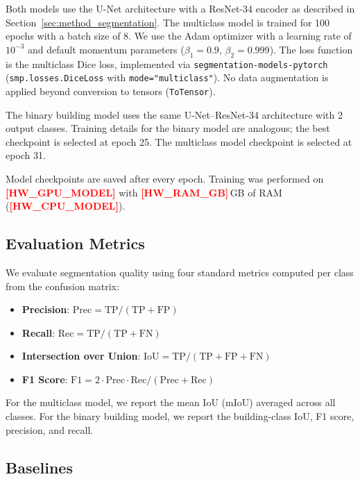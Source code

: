 \documentclass[11pt]{article}
\newcommand{\placeholder}[1]{\textcolor{red}{\textbf{[#1]}}}
\begin{document}
Both models use the U-Net architecture with a ResNet-34 encoder as described in Section~\ref{sec:method_segmentation}.
The multiclass model is trained for 100 epochs with a batch size of 8.
We use the Adam optimizer with a learning rate of $10^{-3}$ and default momentum parameters ($\beta_1 = 0.9$, $\beta_2 = 0.999$).
The loss function is the multiclass Dice loss, implemented via \texttt{segmentation-models-pytorch} (\texttt{smp.losses.DiceLoss} with \texttt{mode="multiclass"}).
No data augmentation is applied beyond conversion to tensors (\texttt{ToTensor}).

The binary building model uses the same U-Net--ResNet-34 architecture with 2 output classes.
Training details for the binary model are analogous; the best checkpoint is selected at epoch 25.
The multiclass model checkpoint is selected at epoch 31.

Model checkpoints are saved after every epoch.
Training was performed on \placeholder{HW\_GPU\_MODEL} with \placeholder{HW\_RAM\_GB}\,GB of RAM (\placeholder{HW\_CPU\_MODEL}).

\subsection{Evaluation Metrics}
\label{sec:experiments_metrics}

We evaluate segmentation quality using four standard metrics computed per class from the confusion matrix:
\begin{itemize}
    \item \textbf{Precision}: $\text{Prec} = \text{TP} / (\text{TP} + \text{FP})$
    \item \textbf{Recall}: $\text{Rec} = \text{TP} / (\text{TP} + \text{FN})$
    \item \textbf{Intersection over Union}: $\text{IoU} = \text{TP} / (\text{TP} + \text{FP} + \text{FN})$
    \item \textbf{F1 Score}: $\text{F1} = 2 \cdot \text{Prec} \cdot \text{Rec} / (\text{Prec} + \text{Rec})$
\end{itemize}
For the multiclass model, we report the mean IoU (mIoU) averaged across all classes.
For the binary building model, we report the building-class IoU, F1 score, precision, and recall.

\subsection{Baselines}
\label{sec:experiments_baselines}
\end{document}
